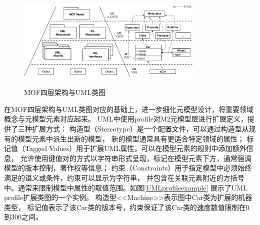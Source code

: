 \begin{figure}[h] %
    \centering %
    \includegraphics[width=0.8\textwidth]{FIGs/chapter3/MOF4.pdf} %
    \caption{MOF四层架构与UML类图\protect\footnotemark[4]} %
    \label{MOF4} %
\end{figure}%

在MOF四层架构与UML类图对应的基础上，进一步细化元模型设计，将重要领域概念与元模型元素对应起来。
UML中使用profile对M2元模型层进行扩展定义，提供了三种扩展方式：
构造型（Stereotype）是一个配置文件，可以通过构造型从现有的模型元素中派生出新的模型，
新的模型通常具有更适合特定领域的属性；
标记值（Tagged Values）用于扩展UML属性，可以在模型元素的规则中添加额外信息，
允许使用键值对的方式以字符串形式呈现，标记在模型元素下方，通常强调模型的版本控制，著作权等信息；
约束（Constraints）用于指定模型中必须始终满足的语义或条件，约束可以显示为字符串，
并包含在关联元素附近的方括号中。通常来限制模型中属性的取值范围。如图\ref{UMLprofileexample}
展示了UML profile扩展类图的一个实例。
构造型<<Machine>>表示图中Car类为扩展的机器类型，
标记值表示了该Car类的版本号，约束保证了该Car类的速度数值限制在0到300之间。

